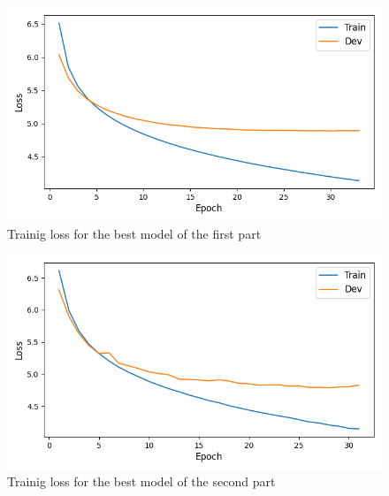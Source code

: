 \documentclass[a4paper]{article}
\begin{document}
\begin{figure}
  \includegraphics[width=\linewidth]{./images/plot_1_loss.png}
  \caption{Trainig loss for the best model of the first part}
  \label{fig:Trainig loss for the best model of the first part}
\end{figure}



\begin{figure}
  \includegraphics[width=\linewidth]{./images/plot_2_loss.png}
  \caption{Trainig loss for the best model of the second part}
  \label{fig:Trainig loss for the best model of the second part}
\end{figure}





\end{document}

